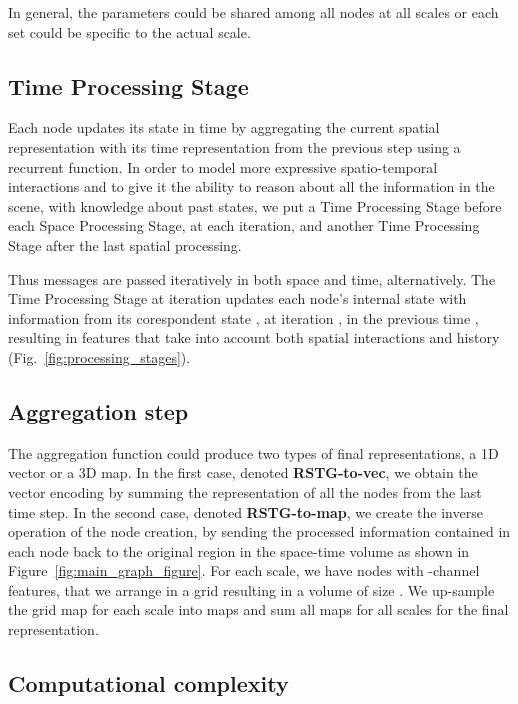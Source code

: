 \documentclass{article}
\begin{document}
In general, the parameters  could be shared among all nodes at all scales or each set could be specific to the actual scale. 

\subsection{Time Processing Stage}
Each node updates its state in time by aggregating the current spatial representation  with its time representation from the previous step using a recurrent function.
In order to model more expressive spatio-temporal interactions and to give it the ability to reason about all the information in the scene, with knowledge about past states, we put a Time Processing Stage before each Space Processing Stage, at each iteration, and another Time Processing Stage after the last spatial processing.

Thus messages are passed iteratively in both space and time, alternatively. The Time Processing Stage at iteration  updates each node's internal state  with information from its corespondent state , at iteration , in the previous time , resulting in features that take into account both spatial interactions and history (Fig.~\ref{fig:processing_stages}).



\subsection{Aggregation step}
\label{section:aggregation}

The aggregation   function could produce two types of final representations, a 1D vector or a 3D map. In the first case, denoted \textbf{RSTG-to-vec}, we obtain the vector encoding by summing the representation of all the nodes from the last time step.
In the second case, denoted \textbf{RSTG-to-map}, we create the inverse operation of the node creation, by sending the processed information contained in each node back to the original region in the space-time volume as shown in Figure~\ref{fig:main_graph_figure}. For each scale, we have  nodes with -channel features, that we arrange in a  grid resulting in a volume of size . We up-sample the grid map for each scale into  maps and sum all maps for all scales for the final  representation.

\newpage

\subsection{Computational complexity}
\end{document}
